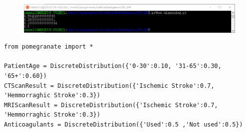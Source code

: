 \documentclass[a4paper, 11pt]{article}
\begin{document}
\begin{figure}[H]
\centering
\includegraphics[width=\linewidth]{fig/result2.png}
\end{figure}
\begin{lstlisting}[title=diagnosing.py]
from pomegranate import *

PatientAge = DiscreteDistribution({'0-30':0.10, '31-65':0.30, '65+':0.60})
CTScanResult = DiscreteDistribution({'Ischemic Stroke':0.7, 'Hemmorraghic Stroke':0.3})
MRIScanResult = DiscreteDistribution({'Ischemic Stroke':0.7, 'Hemmorraghic Stroke':0.3})
Anticoagulants = DiscreteDistribution({'Used':0.5 ,'Not used':0.5})


\end{lstlisting}
\end{document}
